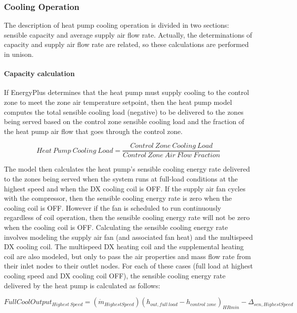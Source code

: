 \subsubsection{Cooling Operation}\label{cooling-operation-2}

The description of heat pump cooling operation is divided in two sections: sensible capacity and average supply air flow rate. Actually, the determinations of capacity and supply air flow rate are related, so these calculations are performed in unison.

\paragraph{Capacity calculation}\label{capacity-calculation}

If EnergyPlus determines that the heat pump must supply cooling to the control zone to meet the zone air temperature setpoint, then the heat pump model computes the total sensible cooling load (negative) to be delivered to the zones being served based on the control zone sensible cooling load and the fraction of the heat pump air flow that goes through the control zone.

\begin{equation}
Heat~Pump~Cooling~Load = \frac{{Control~Zone~Cooling~Load}}{{Control~Zone~Air~Flow~Fraction}}
\end{equation}

The model then calculates the heat pump's sensible cooling energy rate delivered to the zones being served when the system runs at full-load conditions at the highest speed and when the DX cooling coil is OFF. If the supply air fan cycles with the compressor, then the sensible cooling energy rate is zero when the cooling coil is OFF. However if the fan is scheduled to run continuously regardless of coil operation, then the sensible cooling energy rate will not be zero when the cooling coil is OFF. Calculating the sensible cooling energy rate involves modeling the supply air fan (and associated fan heat) and the multispeed DX cooling coil. The multispeed DX heating coil and the supplemental heating coil are also modeled, but only to pass the air properties and mass flow rate from their inlet nodes to their outlet nodes. For each of these cases (full load at highest cooling speed and DX cooling coil OFF), the sensible cooling energy rate delivered by the heat pump is calculated as follows:

\begin{equation}
FullCoolOutpu{t_{Highest~Speed}} = \left( {{{\dot m}_{HighestSpeed}}} \right){\left( {{h_{out,full~load}} - {h_{control~zone}}} \right)_{HRmin}} - {\Delta_{sen,HighestSpeed}}
\end{equation}

